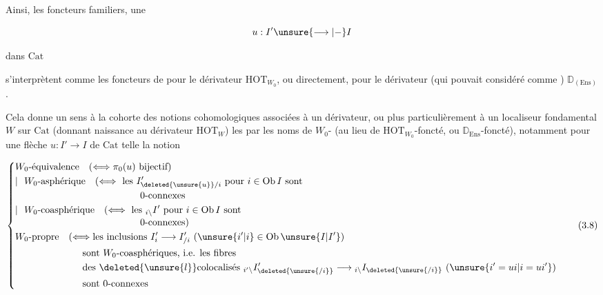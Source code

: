 
Ainsi, les foncteurs familiers,  une 

\[
u:I'\unsure{\longrightarrow|\mathbin{-}}I
\]

dans $\mathrm{Cat}$


s'interprètent comme les foncteurs de  pour le dérivateur $\mathrm{HOT}_{W_0}$, ou  directement, pour le dérivateur (qui pouvait   considéré comme ) $\mathbb{D}_{(\mathrm{Ens})}$.

Cela donne un sens à  la cohorte des notions cohomologiques associées à un dérivateur, ou plus particulièrement à un localiseur fondamental $W$ sur $\mathrm{Cat}$ (donnant naissance au dérivateur $\mathrm{HOT}_W$) \unsure{;}    les  par les noms de $W_0$- (au lieu de $\mathrm{HOT}_{W_0}$-foncté, ou $\mathbb{D}_{\mathrm{Ens}}$-foncté),   notamment pour une flèche $u:I'\longrightarrow I$ de $\mathrm{Cat}$ telle la notion

\[
\left\{\begin{aligned}
& W_0\text{-équivalence}\quad(\Longleftrightarrow\pi_0(u)\text{ bijectif})\\
& \vert\ \ W_0\text{-asphérique}\quad(\Longleftrightarrow\text{ les }I'_{\deleted{\unsure{u}}/i}\text{ pour }i\in\mathrm{Ob}\,I\text{ sont}\\[-2pt]
&\hspace{13em}0\text{-connexes}\\
& \vert\ \ W_0\text{-coasphérique}\quad(\Longleftrightarrow\text{ les }{}_{i\backslash}I'\text{ pour }i\in\mathrm{Ob}\,I\text{ sont}\\[-2pt]
&\hspace{13em}0\text{-connexes})\\
& W_0\text{-propre}\quad(\Longleftrightarrow\text{les inclusions }I'_i\longrightarrow I'_{/i}\ (\unsure{i'|i}\in\mathrm{Ob}\,\unsure{I|I'})\\
&\hspace{7em}\text{sont }W_0\text{-coasphériques, i.e. les fibres}\\
&\hspace{7em}\text{des }\deleted{\unsure{l}}\text{colocalisés }{}_{i'\backslash}I'_{\deleted{\unsure{/i}}}\longrightarrow{}_{i\backslash}I_{\deleted{\unsure{/i}}}\ (\unsure{i'=ui|i=ui'})\\
&\hspace{7em}\text{sont }0\text{-connexes}
\end{aligned}\right. \tag*{(3.8)}
\]

